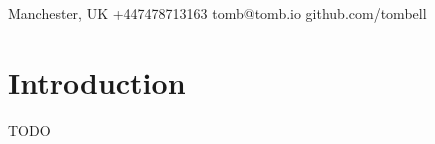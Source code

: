 \documentclass[a4paper]{article}
\author{Tom Bell}
\renewcommand{\maketitle}{
  \begin{center}
    \huge{\textbf\theauthor}
  \end{center}
}
\begin{document}
\maketitle

\begin{center}
  \raisebox{0\height}{\small\faMapMarker} Manchester, UK
  \hspace{1cm}
  \raisebox{-0.1\height}{\small\faMobile} +447478713163
  \hspace{1cm}
  \raisebox{-0.1\height}{\small\faAt} tomb@tomb.io
  \hspace{1cm}
  \raisebox{-0.1\height}{\small\faGithubAlt} github.com/tombell
\end{center}

\section{Introduction}
\small{TODO}
\end{document}

